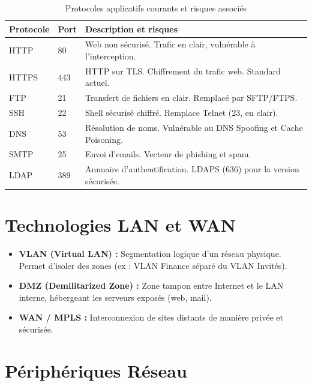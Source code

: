 \begin{table}[H]
\centering
\small
\begin{tabular}{p{2.5cm}p{1.5cm}p{7cm}}
    \toprule
    \textbf{Protocole} & \textbf{Port} & \textbf{Description et risques} \\
    \midrule
    HTTP  & 80  & Web non sécurisé. Trafic en clair, vulnérable à l'interception. \\
    HTTPS & 443 & HTTP sur TLS. Chiffrement du trafic web. Standard actuel. \\
    FTP   & 21  & Transfert de fichiers en clair. Remplacé par SFTP/FTPS. \\
    SSH   & 22  & Shell sécurisé chiffré. Remplace Telnet (23, en clair). \\
    DNS   & 53  & Résolution de noms. Vulnérable au DNS Spoofing et Cache Poisoning. \\
    SMTP  & 25  & Envoi d'emails. Vecteur de phishing et spam. \\
    LDAP  & 389 & Annuaire d'authentification. LDAPS (636) pour la version sécurisée. \\
    \bottomrule
\end{tabular}
\caption{Protocoles applicatifs courants et risques associés}
\end{table}

\section{Technologies LAN et WAN}

\begin{itemize}
    \item \textbf{VLAN (Virtual LAN) :} Segmentation logique d'un réseau physique. Permet d'isoler des zones (ex : VLAN Finance séparé du VLAN Invités).
    \item \textbf{DMZ (Demilitarized Zone) :} Zone tampon entre Internet et le LAN interne, hébergeant les serveurs exposés (web, mail).
    \item \textbf{WAN / MPLS :} Interconnexion de sites distants de manière privée et sécurisée.
\end{itemize}

\section{Périphériques Réseau}

